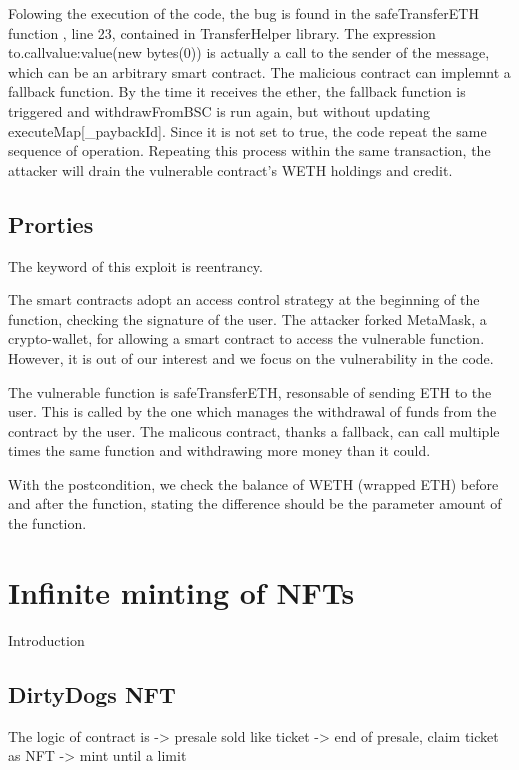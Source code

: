 Folowing the execution of the code, the bug is found in the safeTransferETH function , line 23, contained in TransferHelper library. 
The expression to.call{value:value}(new bytes(0)) is actually a call to the sender of the message, which can be an arbitrary smart contract. 
The malicious contract can implemnt a fallback function. By the time it receives the ether, the fallback function is 
triggered and withdrawFromBSC is run again, but without updating executeMap[\_paybackId]. 
Since it is not set to true, the code repeat the same sequence of operation. 
Repeating this process within the same transaction, the attacker will drain the vulnerable contract's WETH holdings and credit.

\subsection{Prorties}
The keyword of this exploit is reentrancy. 

The smart contracts adopt an access control strategy at the beginning of the function, checking the signature of the user. 
The attacker forked MetaMask, a crypto-wallet, for allowing a smart contract to 
access the vulnerable function. However, it is out of our interest and we focus on the vulnerability in the code.

The vulnerable function is safeTransferETH, resonsable of sending ETH to the user. This is called by the one which manages 
the withdrawal of funds from the contract by the user. The malicous contract, 
thanks a fallback, can call multiple times the same function and withdrawing more money than it could.

With the postcondition, we check the balance of WETH (wrapped ETH) before and after the function, 
stating the difference should be the parameter amount of the function.

\section{Infinite minting of NFTs}   
\label{sec:Exploits:DirtyDogs}
Introduction
\subsection{DirtyDogs NFT}
The logic of contract is 
-> presale sold like ticket
-> end of presale, claim ticket as NFT
-> mint until a limit 

